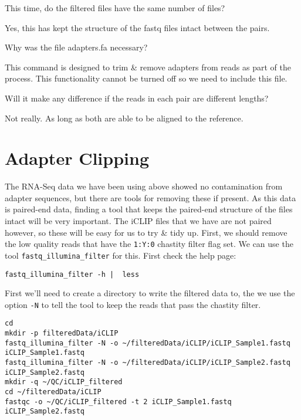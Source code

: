 \begin{questions}
This time, do the filtered files have the same number of files? \\
\begin{answer}
Yes, this has kept the structure of the fastq files intact between the pairs. \\
\end{answer}
Why was the file adapters.fa necessary? \\
\begin{answer}
This command is designed to trim \& remove adapters from reads as part of the process.
This functionality cannot be turned off so we need to include this file.\\
\end{answer}
Will it make any difference if the reads in each pair are different lengths?\\
\begin{answer}
Not really. As long as both are able to be aligned to the reference.
\end{answer}
\end{questions}


\section{Adapter Clipping}
The RNA-Seq data we have been using above showed no contamination from adapter sequences, but there are tools for removing these if present.
As this data is paired-end data, finding a tool that keeps the paired-end structure of the files intact will be very important.
The iCLIP files that we have are not paired however, so these will be easy for us to try \& tidy up.
First, we should remove the low quality reads that have the \texttt{1:Y:0} chastity filter flag set.
We can use the tool \texttt{fastq_illumina_filter} for this.
First check the help page:\\
\begin{lstlisting}
fastq_illumina_filter -h |  less
\end{lstlisting}

First we'll need to create a directory to write the filtered data to, the we use the option \texttt{-N} to tell the tool to keep the reads that pass the chastity filter.

\begin{lstlisting}
cd
mkdir -p filteredData/iCLIP
fastq_illumina_filter -N -o ~/filteredData/iCLIP/iCLIP_Sample1.fastq iCLIP_Sample1.fastq
fastq_illumina_filter -N -o ~/filteredData/iCLIP/iCLIP_Sample2.fastq iCLIP_Sample2.fastq
mkdir -q ~/QC/iCLIP_filtered
cd ~/filteredData/iCLIP
fastqc -o ~/QC/iCLIP_filtered -t 2 iCLIP_Sample1.fastq iCLIP_Sample2.fastq
\end{lstlisting}

